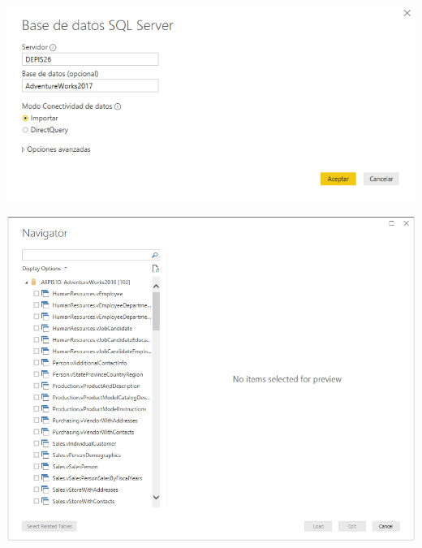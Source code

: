 	\begin{center}
	\includegraphics[width=17cm]{./Imagenes/imagen3}
	\end{center}

	\begin{center}
	\includegraphics[width=17cm]{./Imagenes/imagen4}
	\end{center}
